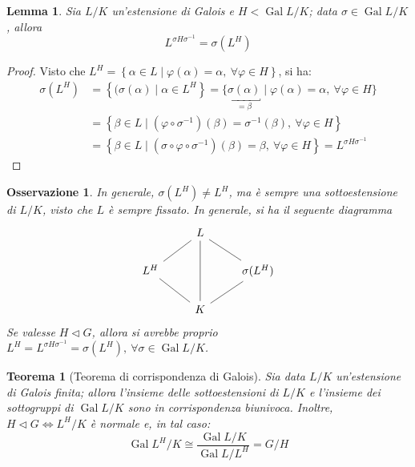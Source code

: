 \documentclass[12pt]{scrartcl}
\theoremstyle{style}
\newtheorem{teorema}{Teorema}[section]
\newtheorem{lemma}{Lemma}[teorema]
\newtheorem{osservazione}{Osservazione}[section]
\numberwithin{equation}{subsection}
\begin{document}
\begin{lemma}\label{lcg2}
	Sia $L / K$ un'estensione di Galois e $H < \operatorname{Gal} L / K$; data $\sigma  \in \operatorname{Gal} L / K$, allora
	\[
	L^{\sigma H\sigma ^{-1}}= \sigma (L^H)
	\] 
\end{lemma}
\begin{proof}
	Visto che $L^H = \left\{ \alpha \in L  \mid \varphi (\alpha ) = \alpha , \ \forall \varphi \in H \right\} $, si ha:
	\[
		\begin{split}
			\sigma (L^H) &= \left\{ (\sigma (\alpha )  \mid \alpha \in L^H \right\} = \big\{ \underbracket{\sigma (\alpha )}_{=\beta }   \mid \varphi (\alpha ) = \alpha , \ \forall \varphi \in H \big\} \\
				     &= \left\{ \beta \in L  \mid (\varphi \circ \sigma ^{-1})(\beta ) = \sigma ^{-1}(\beta ) , \ \forall \varphi  \in H \right\}\\
				     &= \left\{ \beta \in L  \mid (\sigma \circ \varphi \circ \sigma ^{-1}) (\beta ) = \beta , \ \forall \varphi  \in H \right\} = L^{\sigma H \sigma ^{-1}} 
		\end{split}
	\] 
\end{proof}
\begin{osservazione}
In generale, $\sigma (L^H) \neq L^H$, ma \`e sempre una sottoestensione di $L / K$, visto che $L$ \`e sempre fissato.
In generale, si ha il seguente diagramma
\[
	\begin{tikzcd}
&L&\\
	L^H&&\sigma (L^H)\\
	   &K&
	   \arrow[from=1-2, to=2-1, no head]
	   \arrow[from=1-2, to=2-3, no head]
	   \arrow[from=1-2, to=3-2, no head]
	   \arrow[from=3-2, to=2-1, no head]
	   \arrow[from=3-2, to=2-3, no head]
	\end{tikzcd}
\] 
Se valesse $H\lhd G$, allora si avrebbe proprio $L^H = L^{\sigma H\sigma ^{-1}} = \sigma (L^H), \ \forall \sigma \in \operatorname{Gal} L / K$.
\end{osservazione}
\begin{teorema}
	[Teorema di corrispondenza di Galois]
Sia data $L / K$ un'estensione di Galois finita; allora l'insieme delle sottoestensioni di $L / K$ e l'insieme dei sottogruppi di $\operatorname{Gal} L / K$ sono in corrispondenza biunivoca.
Inoltre, $H \lhd G\iff L^H / K$ \`e normale e, in tal caso:
\[
\operatorname{Gal} L^H / K \cong \frac{\operatorname{Gal} L / K}{\operatorname{Gal} L / L^H} = G / H
\] 
\end{teorema}
\end{document}
